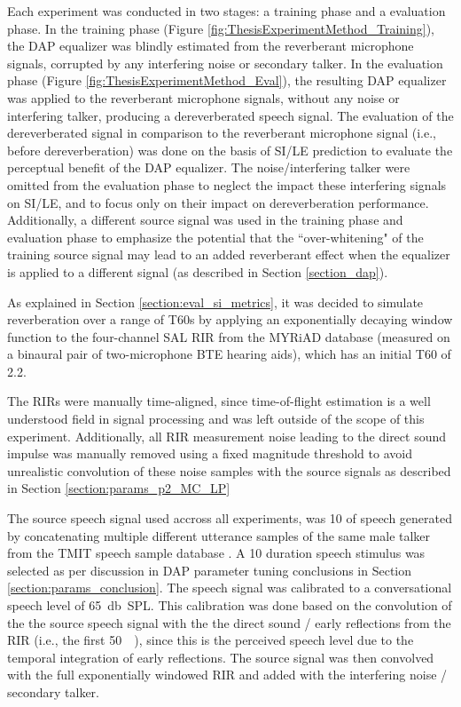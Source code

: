 Each experiment was conducted in two stages: a training phase and a evaluation phase. In the training phase (Figure \ref{fig:ThesisExperimentMethod_Training}), the DAP equalizer was blindly estimated from the reverberant microphone signals, corrupted by any interfering noise or secondary talker. In the evaluation phase (Figure \ref{fig:ThesisExperimentMethod_Eval}), the resulting DAP equalizer was applied to the reverberant microphone signals, without any noise or interfering talker, producing a dereverberated speech signal. The evaluation of the dereverberated signal in comparison to the reverberant microphone signal (i.e., before dereverberation) was done on the basis of SI/LE prediction to evaluate the perceptual benefit of the DAP equalizer. The noise/interfering talker were omitted from the evaluation phase to neglect the impact these interfering signals on SI/LE, and to focus only on their impact on dereverberation performance. Additionally, a different source signal was used in the training phase and evaluation phase to emphasize the potential that the ``over-whitening" of the training source signal may lead to an added reverberant effect when the equalizer is applied to a different signal (as described in Section \ref{section_dap}).

As explained in Section \ref{section:eval_si_metrics}, it was decided to simulate reverberation over a range of T60s by applying an exponentially decaying window function to the four-channel SAL RIR from the MYRiAD database (measured on a binaural pair of two-microphone BTE hearing aids), which has an initial T60 of \qty{2.2}{\sec}.

The RIRs were manually time-aligned, since time-of-flight estimation is a well understood field in signal processing and was left outside of the scope of this experiment. Additionally, all RIR measurement noise leading to the direct sound impulse was manually removed using a fixed magnitude threshold to avoid unrealistic convolution of these noise samples with the source signals as described in Section \ref{section:params_p2_MC_LP}

The source speech signal used accross all experiments, was \qty{10}{\sec} of speech generated by concatenating multiple different utterance samples of the same male talker from the TMIT speech sample database \citep{garofolo1993timit}. A \qty{10}{\sec} duration speech stimulus was selected as per discussion in DAP parameter tuning conclusions in Section \ref{section:params_conclusion}. The speech signal was calibrated to a conversational speech level of \qty{65}{\decibel SPL}. This calibration was done based on the convolution of the the source speech signal with the the direct sound / early reflections from the RIR (i.e., the first \qty{50}{\milli\sec}), since this is the perceived speech level due to the temporal integration of early reflections. The source signal was then convolved with the full exponentially windowed RIR and added with the interfering noise / secondary talker.

